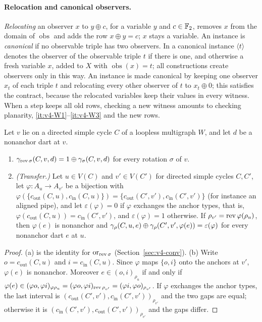 \paragraph{Relocation and canonical observers.}
\emph{Relocating} an observer $x$ to $y\oplus c$, for a variable $y$ and
$c\in\mathbb F_2$, removes $x$ from the domain of $\operatorname{obs}$ and adds the
row $x\oplus y=c$; $x$ stays a variable. An instance is \emph{canonical} if
no observable triple has two observers. In a canonical instance
$\langle t\rangle$ denotes the observer of the observable triple $t$ if there
is one, and otherwise a fresh variable $x$, added to $X$ with
$\operatorname{obs}(x)=t$; all constructions create observers only in this
way. An instance is made
canonical by keeping one observer $x_t$ of each triple $t$ and relocating
every other observer of $t$ to $x_t\oplus0$; this satisfies the contract,
because the relocated variables keep their values in every witness. When a step
keeps all old rows, checking a new witness amounts to checking
planarity, \ref{it:v4-W1}--\ref{it:v4-W3} and the new rows.

\begin{lemma}\label{lem:v4-gaps}
Let $v$ lie on a directed simple cycle $C$ of a loopless multigraph $W$, and
let $d$ be a nonanchor dart at $v$.
\begin{enumerate}[label=(\alph*),nosep]
\item $\gamma_{\operatorname{rev}\sigma}(C,v,d)=1\oplus\gamma_\sigma(C,v,d)$ for every rotation
  $\sigma$ of $v$.
\item \emph{(Transfer.)} Let $u\in V(C)$ and $v'\in V(C')$ for directed
  simple cycles $C,C'$, let $\varphi:A_u\to A_{v'}$ be a bijection with
  $\varphi(\{c_{\mathrm{out}}(C,u),c_{\mathrm{in}}(C,u)\})=
  \{c_{\mathrm{out}}(C',v'),c_{\mathrm{in}}(C',v')\}$ (for instance an aligned
  pipe), and let
  $\varepsilon(\varphi)=0$ if $\varphi$ exchanges the anchor types, that is,
  $\varphi(c_{\mathrm{out}}(C,u))=c_{\mathrm{in}}(C',v')$, and
  $\varepsilon(\varphi)=1$ otherwise. If $\rho_{v'}=\operatorname{rev}\varphi(\rho_u)$, then
  $\varphi(e)$ is nonanchor and
  $\gamma_\rho(C,u,e)\oplus\gamma_\rho(C',v',\varphi(e))=\varepsilon(\varphi)$ for
  every nonanchor dart $e$ at $u$.
\end{enumerate}
\end{lemma}

\begin{proof}
(a) is the identity for $\operatorname{or}_{\operatorname{rev}\sigma}$
(Section~\ref{sec:v4-conv}). (b) Write $o=c_{\mathrm{out}}(C,u)$ and $i=c_{\mathrm{in}}(C,u)$. Since
$\varphi$ maps $\{o,i\}$ onto the anchors at $v'$, $\varphi(e)$ is
nonanchor. Moreover
$e\in(o,i)_{\rho_u}$ if and only if $\varphi(e)\in(\varphi o,\varphi
i)_{\varphi\rho_u}=(\varphi o,\varphi i)_{\operatorname{rev}\rho_{v'}}=(\varphi i,\varphi
o)_{\rho_{v'}}$. If $\varphi$ exchanges the anchor types, the last interval
is $(c_{\mathrm{out}}(C',v'),c_{\mathrm{in}}(C',v'))_{\rho_{v'}}$ and the two
gaps are equal; otherwise it is $(c_{\mathrm{in}}(C',v'),
c_{\mathrm{out}}(C',v'))_{\rho_{v'}}$ and the gaps differ.
\end{proof}
